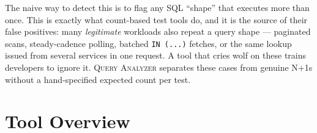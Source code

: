 \documentclass[sigplan,screen]{acmart}
\newcommand{\tool}{\textsc{Query Analyzer}}
\newcommand{\code}[1]{\texttt{\small #1}}
\begin{document}
The naive way to detect this is to flag any SQL ``shape'' that executes more than
once. This is exactly what count-based test tools do, and it is the source of
their false positives: many \emph{legitimate} workloads also repeat a query
shape --- paginated scans, steady-cadence polling, batched \code{IN (...)}
fetches, or the same lookup issued from several services in one request. A tool
that cries wolf on these trains developers to ignore it. \tool{} separates these
cases from genuine N+1s without a hand-specified expected count per test.

\section{Tool Overview}
\end{document}
